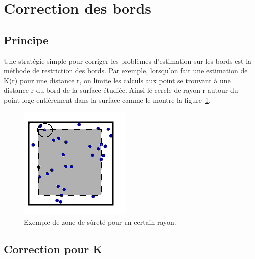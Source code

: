 \documentclass[stage2a]{tnreport}
\begin{document}

\section{Correction des bords}

\subsection{Principe}

Une stratégie simple pour corriger les problèmes d'estimation sur les bords est la méthode de restriction des bords. Par exemple, lorsqu'on fait une estimation de K(r) pour une distance r, on limite les calculs aux point se trouvant à une distance r du bord de la surface étudiée. Ainsi le cercle de rayon r autour du point loge entièrement dans la surface comme le montre la figure~\ref{fig:bords}.

\begin{figure}[h]
  \centering
  \includegraphics[scale=0.55]{figures/bords2.png}
  \caption{Exemple de zone de sûreté pour un certain rayon.}
  \label{fig:bords}
\end{figure}


\subsection{Correction pour K}
\end{document}
